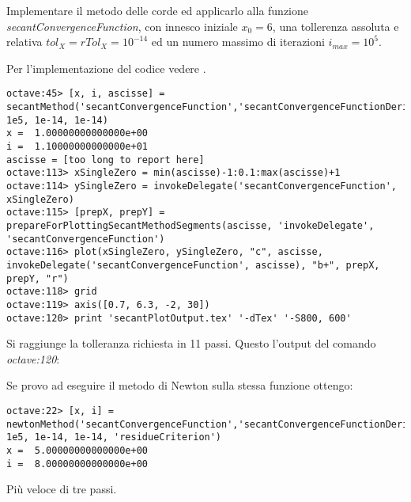 \begin{exercise}
Implementare il metodo delle corde ed applicarlo alla funzione
\emph{secantConvergenceFunction}, con innesco iniziale $x_{0} = 6$, una
tollerenza assoluta e relativa $tol_{X} = rTol_{X} = 10^{-14}$ ed un numero massimo di iterazioni
$i_{max} = 10^{5}$.
\end{exercise}
Per l'implementazione del codice vedere .
\begin{lstlisting}
octave:45> [x, i, ascisse] = secantMethod('secantConvergenceFunction','secantConvergenceFunctionDerivative',6,
1e5, 1e-14, 1e-14)
x =  1.00000000000000e+00
i =  1.10000000000000e+01
ascisse = [too long to report here]
octave:113> xSingleZero = min(ascisse)-1:0.1:max(ascisse)+1
octave:114> ySingleZero = invokeDelegate('secantConvergenceFunction', xSingleZero)
octave:115> [prepX, prepY] = prepareForPlottingSecantMethodSegments(ascisse, 'invokeDelegate', 'secantConvergenceFunction')
octave:116> plot(xSingleZero, ySingleZero, "c", ascisse, invokeDelegate('secantConvergenceFunction', ascisse), "b+", prepX, prepY, "r")
octave:118> grid
octave:119> axis([0.7, 6.3, -2, 30])
octave:120> print 'secantPlotOutput.tex' '-dTex' '-S800, 600'
\end{lstlisting}
Si raggiunge la tolleranza richiesta in 11 passi. Questo l'output del comando
\emph{octave:120}:
\begin{center}

\end{center}
\begin{oss}
Se provo ad eseguire il metodo di Newton sulla stessa funzione ottengo:
\begin{lstlisting}
octave:22> [x, i] =
newtonMethod('secantConvergenceFunction','secantConvergenceFunctionDerivative',6, 1e5, 1e-14, 1e-14, 'residueCriterion')
x =  5.00000000000000e+00
i =  8.00000000000000e+00
\end{lstlisting}
Pi\`u veloce di tre passi.
\end{oss}
